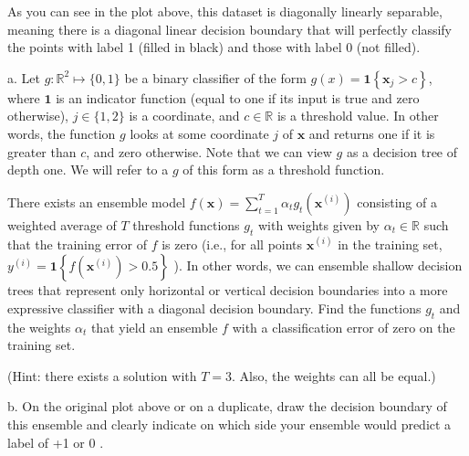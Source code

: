 \documentclass[10pt]{article}
\begin{document}
As you can see in the plot above, this dataset is diagonally linearly separable, meaning there is a diagonal linear decision boundary that will perfectly classify the points with label 1 (filled in black) and those with label 0 (not filled).

a. Let $g: \mathbb{R}^{2} \mapsto\{0,1\}$ be a binary classifier of the form $g(x)=\mathbf{1}\left\{\mathbf{x}_{j}>c\right\}$, where $\mathbf{1}$ is an indicator function (equal to one if its input is true and zero otherwise), $j \in\{1,2\}$ is a coordinate, and $c \in \mathbb{R}$ is a threshold value. In other words, the function $g$ looks at some coordinate $j$ of $\mathbf{x}$ and
returns one if it is greater than $c$, and zero otherwise. Note that we can view $g$ as a decision tree of depth one. We will refer to a $g$ of this form as a threshold function.

There exists an ensemble model $f(\mathbf{x})=\sum_{t=1}^{T} \alpha_{t} g_{t}\left(\mathbf{x}^{(i)}\right)$ consisting of a weighted average of $T$ threshold functions $g_{t}$ with weights given by $\alpha_{t} \in \mathbb{R}$ such that the training error of $f$ is zero (i.e., for all points $\mathbf{x}^{(i)}$ in the training set, $y^{(i)}=\mathbf{1}\left\{f\left(\mathbf{x}^{(i)}\right)>0.5\right\}$ ). In other words, we can ensemble shallow decision trees that represent only horizontal or vertical decision boundaries into a more expressive classifier with a diagonal decision boundary. Find the functions $g_{t}$ and the weights $\alpha_{t}$ that yield an ensemble $f$ with a classification error of zero on the training set.

(Hint: there exists a solution with $T=3$. Also, the weights can all be equal.)

b. On the original plot above or on a duplicate, draw the decision boundary of this ensemble and clearly indicate on which side your ensemble would predict a label of +1 or 0 .
\end{document}
